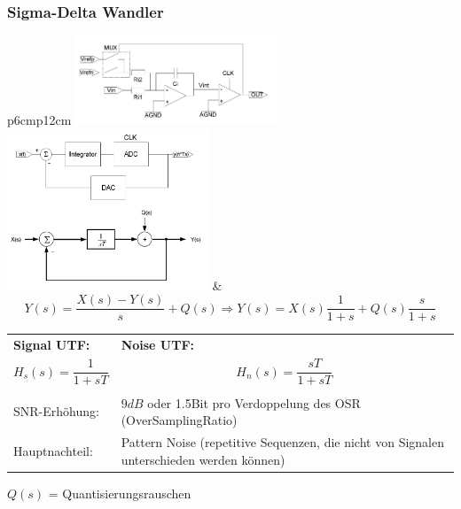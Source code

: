 \subsubsection{Sigma-Delta Wandler }
  \begin{longtable}{p{6cm}p{12cm}}
    \includegraphics[width=6cm, valign=t]{pictures/deltaSigma1} \newline 
    \includegraphics[width=6cm]{pictures/deltaSigma3} &
    \[Y(s)=\frac{X(s)-Y(s)}{s}+Q(s)\Rightarrow Y(s)=X(s)\frac{1}{1+s}+Q(s)\frac{s}{1+s}\] \newline
    \begin{tabular}{p{3cm}p{9cm}}
      \textbf{Signal UTF:} &
      \textbf{Noise UTF:} \\
      
      \[ H_s(s) = \frac{1}{1+sT} \] &    
      \[ H_n(s) = \frac{sT}{1+sT} \] \\ \\
      
      SNR-Erhöhung: &
      $9dB$ oder 1.5Bit pro Verdoppelung des OSR (OverSamplingRatio) \\
      Hauptnachteil: &
      Pattern Noise (repetitive Sequenzen, die nicht von Signalen unterschieden werden können)
    \end{tabular}
    $Q(s)$ = Quantisierungsrauschen
    
  \end{longtable}

